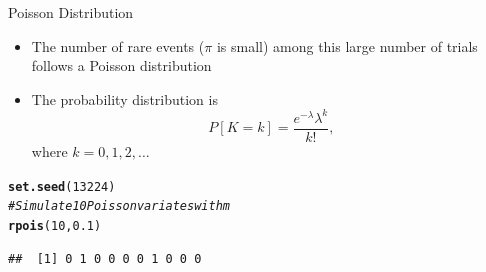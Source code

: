 \documentclass[xcolor=x11names,compress]{beamer}\usepackage[]{graphicx}\usepackage[]{color}
\makeatletter
\newcommand{\hlnum}[1]{\textcolor[rgb]{0.686,0.059,0.569}{#1}}%
\newcommand{\hlcom}[1]{\textcolor[rgb]{0.678,0.584,0.686}{\textit{#1}}}%
\newcommand{\hlstd}[1]{\textcolor[rgb]{0.345,0.345,0.345}{#1}}%
\newcommand{\hlkwd}[1]{\textcolor[rgb]{0.737,0.353,0.396}{\textbf{#1}}}%
\newenvironment{kframe}{%
 \def\at@end@of@kframe{}%
 \ifinner\ifhmode%
  \def\at@end@of@kframe{\end{minipage}}%
  \begin{minipage}{\columnwidth}%
 \fi\fi%
 \def\FrameCommand##1{\hskip\@totalleftmargin \hskip-\fboxsep
 \colorbox{shadecolor}{##1}\hskip-\fboxsep
     \hskip-\linewidth \hskip-\@totalleftmargin \hskip\columnwidth}%
 \MakeFramed {\advance\hsize-\width
   \@totalleftmargin\z@ \linewidth\hsize
   \@setminipage}}%
 {\par\unskip\endMakeFramed%
 \at@end@of@kframe}
\newenvironment{knitrout}{}{} %
\makeatother
\begin{document}
\begin{frame}[fragile]{Poisson Distribution}
  \begin{itemize}
  \item The number of rare events ($\pi$ is small) among this large number of trials
        follows a Poisson distribution
  \item The probability distribution is
    \begin{equation*}
      P[K=k] = \frac{e^{-\lambda} \lambda^k}{k!},
    \end{equation*}
   where $k=0,1,2,\ldots$
    \end{itemize}
\begin{knitrout}\tiny
{}\color{fgcolor}\begin{kframe}
\begin{alltt}
\hlkwd{set.seed}\hlstd{(}\hlnum{13224}\hlstd{)}
\hlcom{# Simulate 10 Poisson variates with m}
\hlkwd{rpois}\hlstd{(}\hlnum{10}\hlstd{,}\hlnum{0.1}\hlstd{)}
\end{alltt}
\begin{verbatim}
##  [1] 0 1 0 0 0 0 1 0 0 0
\end{verbatim}
\end{kframe}
\end{knitrout}
\end{frame}
\end{document}
